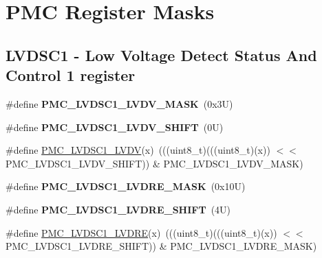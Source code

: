 \hypertarget{group___p_m_c___register___masks}{}\section{P\+MC Register Masks}
\label{group___p_m_c___register___masks}
\subsection*{L\+V\+D\+S\+C1 -\/ Low Voltage Detect Status And Control 1 register}
\begin{DoxyCompactItemize}
\item 
\mbox{\label{group___p_m_c___register___masks_ga777eada2a526d88569a30323e9d3e1d3}} 
\#define {\bfseries P\+M\+C\+\_\+\+L\+V\+D\+S\+C1\+\_\+\+L\+V\+D\+V\+\_\+\+M\+A\+SK}~(0x3\+U)
\item 
\mbox{\label{group___p_m_c___register___masks_gaaf45daa6de387f93bc57f1218ab17a16}} 
\#define {\bfseries P\+M\+C\+\_\+\+L\+V\+D\+S\+C1\+\_\+\+L\+V\+D\+V\+\_\+\+S\+H\+I\+FT}~(0\+U)
\item 
\#define \mbox{\hyperlink{group___p_m_c___register___masks_gae2cf4048ec29cc1a54349d8bc18e27e4}{P\+M\+C\+\_\+\+L\+V\+D\+S\+C1\+\_\+\+L\+V\+DV}}(x)~(((uint8\+\_\+t)(((uint8\+\_\+t)(x)) $<$$<$ P\+M\+C\+\_\+\+L\+V\+D\+S\+C1\+\_\+\+L\+V\+D\+V\+\_\+\+S\+H\+I\+FT)) \& P\+M\+C\+\_\+\+L\+V\+D\+S\+C1\+\_\+\+L\+V\+D\+V\+\_\+\+M\+A\+SK)
\item 
\mbox{\label{group___p_m_c___register___masks_gad771f87e373907e3ef60e5fa31001fad}} 
\#define {\bfseries P\+M\+C\+\_\+\+L\+V\+D\+S\+C1\+\_\+\+L\+V\+D\+R\+E\+\_\+\+M\+A\+SK}~(0x10\+U)
\item 
\mbox{\label{group___p_m_c___register___masks_ga056ca878a20782f5bf65b3be3e98581d}} 
\#define {\bfseries P\+M\+C\+\_\+\+L\+V\+D\+S\+C1\+\_\+\+L\+V\+D\+R\+E\+\_\+\+S\+H\+I\+FT}~(4\+U)
\item 
\#define \mbox{\hyperlink{group___p_m_c___register___masks_ga5cb39f8534fc256799aa9e495b5f449d}{P\+M\+C\+\_\+\+L\+V\+D\+S\+C1\+\_\+\+L\+V\+D\+RE}}(x)~(((uint8\+\_\+t)(((uint8\+\_\+t)(x)) $<$$<$ P\+M\+C\+\_\+\+L\+V\+D\+S\+C1\+\_\+\+L\+V\+D\+R\+E\+\_\+\+S\+H\+I\+FT)) \& P\+M\+C\+\_\+\+L\+V\+D\+S\+C1\+\_\+\+L\+V\+D\+R\+E\+\_\+\+M\+A\+SK)

\end{DoxyCompactItemize}
